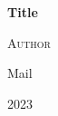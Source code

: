 \begin{titlepage}
\centering
\null
\vfill
{\huge\bfseries Title \par}
\vspace{1cm}
{\Large \textsc{Author} \par}
{Mail \par}

\vfill 
{\large 2023 \par}
\end{titlepage}

